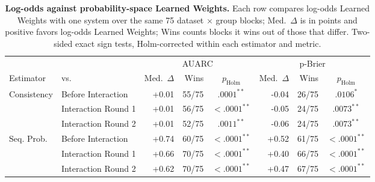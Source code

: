 \begin{table}[t]
\centering
\small
\setlength{\tabcolsep}{3.5pt}
\begin{tabular}{ll rrc rrc}
\toprule
 & & \multicolumn{3}{c}{AUARC} & \multicolumn{3}{c}{p-Brier} \\
\cmidrule(lr){3-5} \cmidrule(lr){6-8}
Estimator & vs. & Med.\ $\Delta$ & Wins & $p_{\mathrm{Holm}}$ & Med.\ $\Delta$ & Wins & $p_{\mathrm{Holm}}$ \\
\midrule
Consistency & Before Interaction & +0.01 & 55/75 & $.0001^{**}$ & -0.04 & 26/75 & $.0106^{*}$ \\
 & Interaction Round 1 & +0.01 & 56/75 & $<.0001^{**}$ & -0.05 & 24/75 & $.0073^{**}$ \\
 & Interaction Round 2 & +0.01 & 52/75 & $.0011^{**}$ & -0.06 & 24/75 & $.0073^{**}$ \\
\midrule
Seq. Prob. & Before Interaction & +0.74 & 60/75 & $<.0001^{**}$ & +0.52 & 61/75 & $<.0001^{**}$ \\
 & Interaction Round 1 & +0.66 & 70/75 & $<.0001^{**}$ & +0.40 & 66/75 & $<.0001^{**}$ \\
 & Interaction Round 2 & +0.62 & 70/75 & $<.0001^{**}$ & +0.47 & 67/75 & $<.0001^{**}$ \\
\bottomrule
\end{tabular}
\caption{\textbf{Log-odds against probability-space Learned Weights.} Each row compares log-odds Learned Weights with one system over the same 75 dataset $\times$ group blocks; Med.\ $\Delta$ is in points and positive favors log-odds Learned Weights; Wins counts blocks it wins out of those that differ. Two-sided exact sign tests, Holm-corrected within each estimator and metric.}
\label{tab:significance_spaces}
\end{table}
